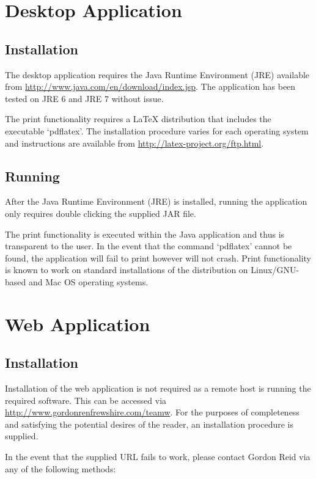 \section{Desktop Application}

\subsection{Installation}

The desktop application requires the Java Runtime Environment (JRE) available 
from \url{http://www.java.com/en/download/index.jsp}. The application has been 
tested on JRE 6 and JRE 7 without issue.

The print functionality requires a LaTeX distribution that includes the
executable `pdflatex'. The installation procedure varies for each operating
system and instructions are available from
\url{http://latex-project.org/ftp.html}.

\subsection{Running}

After the Java Runtime Environment (JRE) is installed, running the application
only requires double clicking the supplied JAR file.

The print functionality is executed within the Java application and thus is
transparent to the user. In the event that the command `pdflatex' cannot be
found, the application will fail to print however will not crash. Print
functionality is known to work on standard installations of the distribution
on Linux/GNU-based and Mac OS operating systems.

\section{Web Application}

\subsection{Installation}

Installation of the web application is not required as a remote host is running
the required software. This can be accessed via 
\url{http://www.gordonrenfrewshire.com/teamw}. For the purposes of completeness
and satisfying the potential desires of the reader, an installation procedure
is supplied.

In the event that the supplied URL fails to work, please contact Gordon Reid
via any of the following methods:

